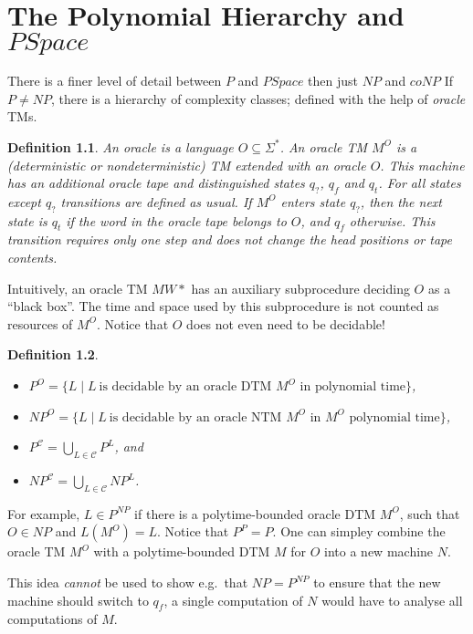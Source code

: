 \documentclass{report}
\newcommand{\NP}{\text{$\mathit{NP}$}\xspace}
\newcommand{\Po}{\text{$\mathit{P}$}\xspace}
\newtheorem{definition}{Definition}[chapter]
\begin{document}

\chapter{The Polynomial Hierarchy and $PSpace$}

There is a finer level of detail between $\Po$ and $PSpace$ then just $\NP$ and $co\NP$ If $\Po \neq \NP$, there is a hierarchy of complexity classes; defined with the help of \emph{oracle} TMs. 

\begin{definition} An \emph{oracle} is a language $O \subseteq \Sigma^*$. An \emph{oracle TM $M^O$} is a (deterministic or nondeterministic) TM extended with an oracle $O$. This machine has an additional \emph{oracle tape} and distinguished states $q_?$, $q_f$ and $q_t$. For all states except $q_?$ transitions are defined as usual. If $M^O$ enters state $q_?$, then the next state is $q_t$ if the word in the oracle tape belongs to $O$, and $q_f$ otherwise. This transition requires only one step and does not change the head positions or tape contents. 
\end{definition}
Intuitively, an oracle TM $MW*$ has an auxiliary subprocedure deciding $O$ as a ``black box''. The time and space used by this subprocedure is not counted as resources of $M^O$. Notice that $O$ does not even need to be decidable!

\begin{definition} \mbox{}
\begin{itemize}
 \item $\Po^O = \{ L \mid L~\text{is decidable by an oracle DTM $M^O$ in polynomial time}\}$,
 \item $\NP^O = \{ L \mid L~\text{is decidable by an oracle NTM $M^O$ in $M^O$ polynomial time}\}$,
 \item $\Po^{\mathcal{C}} = \bigcup_{L \in \mathcal{C}} \Po^L$, and 
 \item $\NP^{\mathcal{C}} = \bigcup_{L \in \mathcal{C}} \NP^L$. 
\end{itemize}
\end{definition}
For example, $L \in \Po^\NP$ if there is a polytime-bounded oracle DTM $M^O$, such that $O \in \NP$ and $L(M^O) = L$. Notice that $\Po^\Po = P$. One can simpley combine the oracle TM $M^O$ with a polytime-bounded DTM $M$ for $O$ into a new machine $N$. 

This idea \emph{cannot} be used to show e.g.\ that $\NP = \Po^{\NP}$ to ensure that the new machine should switch to $q_f$, a single computation of $N$ would have to analyse all computations of $M$. 
\end{document}
